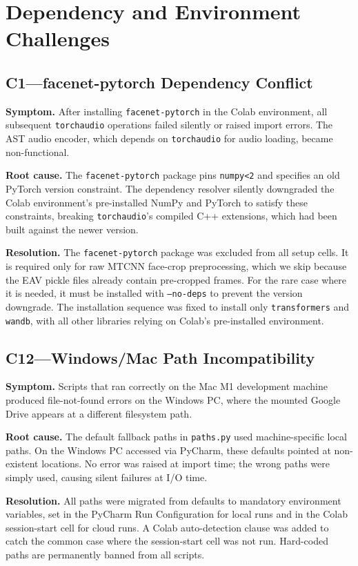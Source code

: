 \section{Dependency and Environment Challenges}
\subsection*{C1---facenet-pytorch Dependency Conflict}
\textbf{Symptom.} After installing \texttt{facenet-pytorch} in the Colab environment, all subsequent \texttt{torchaudio} operations failed silently or raised import errors. The AST audio encoder, which depends on \texttt{torchaudio} for audio loading, became non-functional.

\textbf{Root cause.} The \texttt{facenet-pytorch} package pins \texttt{numpy<2} and specifies an old PyTorch version constraint. The dependency resolver silently downgraded the Colab environment's pre-installed NumPy and PyTorch to satisfy these constraints, breaking \texttt{torchaudio}'s compiled C++ extensions, which had been built against the newer version.

\textbf{Resolution.} The \texttt{facenet-pytorch} package was excluded from all setup cells. It is required only for raw MTCNN face-crop preprocessing, which we skip because the EAV pickle files already contain pre-cropped frames. For the rare case where it is needed, it must be installed with \texttt{--no-deps} to prevent the version downgrade. The installation sequence was fixed to install only \texttt{transformers} and \texttt{wandb}, with all other libraries relying on Colab's pre-installed environment.

\subsection*{C12---Windows/Mac Path Incompatibility}
\textbf{Symptom.} Scripts that ran correctly on the Mac M1 development machine produced file-not-found errors on the Windows PC, where the mounted Google Drive appears at a different filesystem path.

\textbf{Root cause.} The default fallback paths in \texttt{paths.py} used machine-specific local paths. On the Windows PC accessed via PyCharm, these defaults pointed at non-existent locations. No error was raised at import time; the wrong paths were simply used, causing silent failures at I/O time.

\textbf{Resolution.} All paths were migrated from defaults to mandatory environment variables, set in the PyCharm Run Configuration for local runs and in the Colab session-start cell for cloud runs. A Colab auto-detection clause was added to catch the common case where the session-start cell was not run. Hard-coded paths are permanently banned from all scripts.

